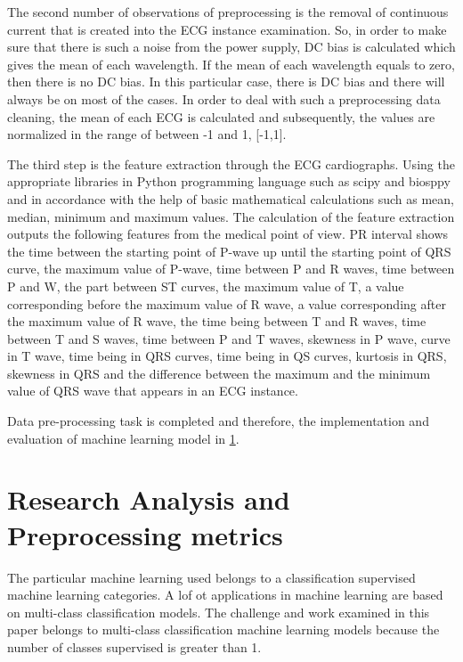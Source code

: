 \documentclass[review]{elsarticle}
\begin{document}
The second number of observations of preprocessing is the removal of continuous current that is created into the ECG instance examination.  So, in order to make sure that there is such a noise from the power supply, DC bias is calculated which gives the mean of each wavelength. If the mean of each wavelength equals to zero, then there is no DC bias. In this particular case, there is DC bias and there will always be on most of the cases. In order to deal with such a preprocessing data cleaning, the mean of each ECG is calculated and subsequently, the values are normalized in the range of between -1 and 1, [-1,1]. 

The third step is the feature extraction through the ECG cardiographs. Using the appropriate libraries in Python programming language such as scipy and biosppy and in accordance with the help of basic mathematical calculations such as mean, median, minimum and maximum values. The calculation of the feature extraction outputs the following features from the medical point of view. PR interval shows the time between the starting point of P-wave up until the starting point of QRS curve, the maximum value of P-wave, time between P and R waves, time between P and W, the part between ST curves, the maximum value of T, a value corresponding before the maximum value of R wave, a value corresponding after the maximum value of R wave, the time being between T and R waves, time between T and S waves, time between P and T waves, skewness in P wave, curve in T wave, time being in QRS curves, time being in QS curves, kurtosis in QRS, skewness in QRS and the difference between the maximum and the minimum value of QRS wave that appears in an ECG instance. 

Data pre-processing task is completed and therefore, the implementation and evaluation of machine learning model in \ref{sec:ResearchOutcomes}.



\section{Research Analysis and Preprocessing metrics}\label{sec:ResearchOutcomes}
The particular machine learning used belongs to a classification supervised machine learning categories. A lof ot applications in machine learning are based on multi-class classification models. The challenge and work examined in this paper belongs to multi-class classification machine learning models because the number of classes supervised is greater than 1.
\end{document}
